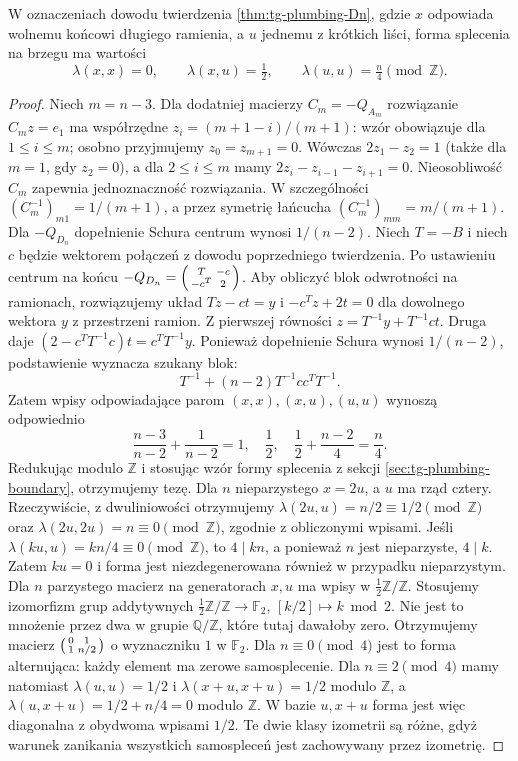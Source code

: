 \begin{stwierdzenie}
\label{st:tg-plumbing-Dn-linking}
W oznaczeniach dowodu twierdzenia
\ref{thm:tg-plumbing-Dn}, gdzie $x$ odpowiada
wolnemu końcowi długiego ramienia, a $u$
jednemu z krótkich liści, forma splecenia
na brzegu ma wartości
\[
\lambda(x,x)=0,\qquad
\lambda(x,u)=\tfrac12,\qquad
\lambda(u,u)=\tfrac n4\pmod{\mathbb Z}.
\]
\end{stwierdzenie}
\begin{proof}
Niech $m=n-3$. Dla dodatniej macierzy
$C_m=-Q_{A_m}$ rozwiązanie $C_m z=e_1$
ma współrzędne $z_i=(m+1-i)/(m+1)$:
wzór obowiązuje dla $1\le i\le m$;
osobno przyjmujemy $z_0=z_{m+1}=0$.
Wówczas $2z_1-z_2=1$ (także dla $m=1$,
gdy $z_2=0$), a dla $2\le i\le m$ mamy
$2z_i-z_{i-1}-z_{i+1}=0$.
Nieosobliwość $C_m$ zapewnia jednoznaczność
rozwiązania.
W szczególności $(C_m^{-1})_{m1}=1/(m+1)$,
a przez symetrię łańcucha
$(C_m^{-1})_{mm}=m/(m+1)$.
Dla $-Q_{D_n}$ dopełnienie Schura centrum
wynosi $1/(n-2)$. Niech $T=-B$ i niech $c$ będzie wektorem
połączeń z dowodu poprzedniego twierdzenia.
Po ustawieniu centrum na końcu
$-Q_{D_n}=\begin{psmallmatrix}T&-c\\-c^T&2\end{psmallmatrix}$.
Aby obliczyć blok odwrotności na ramionach,
rozwiązujemy układ $Tz-ct=y$ i $-c^Tz+2t=0$
dla dowolnego wektora $y$ z przestrzeni ramion.
Z pierwszej równości $z=T^{-1}y+T^{-1}ct$.
Druga daje
$(2-c^TT^{-1}c)t=c^TT^{-1}y$.
Ponieważ dopełnienie Schura wynosi
$1/(n-2)$, podstawienie wyznacza szukany blok:
\[
T^{-1}+(n-2)T^{-1}cc^TT^{-1}.
\] Zatem wpisy odpowiadające
parom $(x,x),(x,u),(u,u)$ wynoszą
odpowiednio
\[
\frac{n-3}{n-2}+\frac1{n-2}=1,\quad
\frac12,\quad
\frac12+\frac{n-2}4=\frac n4.
\]
Redukując modulo $\mathbb Z$ i stosując
wzór formy splecenia z sekcji
\ref{sec:tg-plumbing-boundary}, otrzymujemy
tezę. Dla $n$ nieparzystego $x=2u$,
a $u$ ma rząd cztery. Rzeczywiście,
z dwuliniowości otrzymujemy
$\lambda(2u,u)=n/2\equiv1/2\pmod{\mathbb Z}$
oraz $\lambda(2u,2u)=n\equiv0\pmod{\mathbb Z}$,
zgodnie z obliczonymi wpisami.
Jeśli $\lambda(ku,u)=kn/4\equiv0\pmod{\mathbb Z}$,
to $4\mid kn$, a ponieważ $n$ jest nieparzyste,
$4\mid k$. Zatem $ku=0$ i forma jest
niezdegenerowana również w przypadku nieparzystym. Dla $n$ parzystego
macierz na generatorach $x,u$ ma wpisy
w $\frac12\mathbb Z/\mathbb Z$.
Stosujemy izomorfizm grup addytywnych
$\frac12\mathbb Z/\mathbb Z\to\mathbb F_2$,
$[k/2]\mapsto k\bmod 2$.
Nie jest to mnożenie przez dwa w grupie
$\mathbb Q/\mathbb Z$, które tutaj dawałoby
zero. Otrzymujemy macierz
$\begin{psmallmatrix}0&1\\1&n/2\end{psmallmatrix}$
o wyznaczniku $1$ w $\mathbb F_2$.
Dla $n\equiv0\pmod4$ jest to forma alternująca:
każdy element ma zerowe samosplecenie.
Dla $n\equiv2\pmod4$ mamy natomiast
$\lambda(u,u)=1/2$ i
$\lambda(x+u,x+u)=1/2$ modulo $\mathbb Z$,
a $\lambda(u,x+u)=1/2+n/4=0$ modulo $\mathbb Z$.
W bazie $u,x+u$ forma jest więc diagonalna
z obydwoma wpisami $1/2$.
Te dwie klasy izometrii są różne, gdyż
warunek zanikania wszystkich samospleceń
jest zachowywany przez izometrię.
\end{proof}

